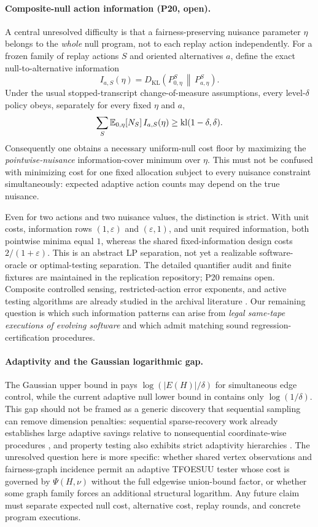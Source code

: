\paragraph{Composite-null action information (P20, open).}
A central unresolved difficulty is that a fairness-preserving nuisance parameter
$\eta$ belongs to the \emph{whole} null program, not to each replay action
independently. For a frozen family of replay actions $S$ and oriented
alternatives $a$, define the exact null-to-alternative information
\[
I_{a,S}(\eta)
=
D_{\mathrm{KL}}\!\left(
P_{0,\eta}^{S}\,\middle\|\,P_{a,\eta}^{S}
\right).
\]
Under the usual stopped-transcript change-of-measure assumptions, every
level-$\delta$ policy obeys, separately for every fixed $\eta$ and $a$,
\[
\sum_S
\mathbb{E}_{0,\eta}[N_S]\,I_{a,S}(\eta)
\ge
\mathrm{kl}(1-\delta,\delta).
\]
Consequently one obtains a necessary uniform-null cost floor by maximizing
the \emph{pointwise-nuisance} information-cover minimum over $\eta$.
This must not be confused with minimizing cost for one fixed allocation
subject to every nuisance constraint simultaneously: expected adaptive
action counts may depend on the true nuisance.

Even for two actions and two nuisance values, the distinction is strict.
With unit costs, information rows $(1,\varepsilon)$ and
$(\varepsilon,1)$, and unit required information, both pointwise
minima equal $1$, whereas the shared fixed-information design costs
$2/(1+\varepsilon)$. This is an abstract LP separation, not yet a
realizable software-oracle or optimal-testing separation.
The detailed quantifier audit and finite fixtures are maintained in the
replication repository; P20 remains open. Composite controlled sensing,
restricted-action error exponents, and active testing algorithms are already
studied in the archival literature
\cite{DeshmukhVeeravalliBhashyam2021,HsuWang2025,GanJiaLiTayur2025}.
Our remaining question is which such information patterns can arise from
\emph{legal same-tape executions of evolving software} and which admit
matching sound regression-certification procedures.

\paragraph{Adaptivity and the Gaussian logarithmic gap.}
The Gaussian upper bound in  pays
$\log(|E(H)|/\delta)$ for simultaneous edge control, while the current adaptive
null lower bound in  contains only $\log(1/\delta)$.  This gap
should not be framed as a generic discovery that sequential sampling can remove
dimension penalties: sequential sparse-recovery work already establishes large
adaptive savings relative to nonsequential coordinate-wise procedures
\cite{MalloyNowak2014}, and property testing also exhibits strict adaptivity
hierarchies \cite{CanonneGur2018,Hurwitz2011}.  The unresolved question here is
more specific: whether shared vertex observations and fairness-graph incidence
permit an adaptive TFOESUU tester whose cost is governed by $\Psi(H,\nu)$
without the full edgewise union-bound factor, or whether some graph family forces
an additional structural logarithm.  Any future claim must separate expected
null cost, alternative cost, replay rounds, and concrete program executions.

